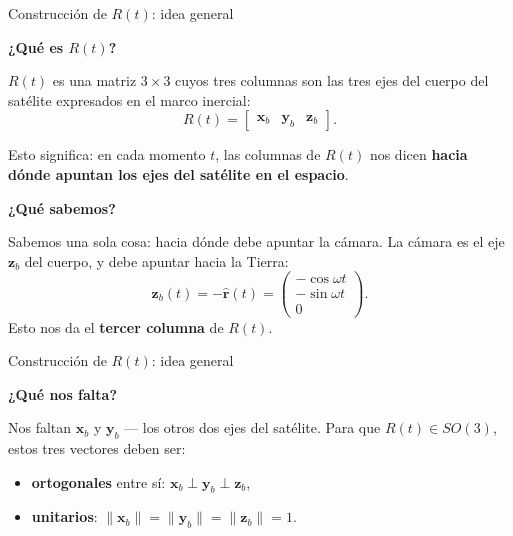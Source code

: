 \documentclass[11pt]{beamer}
\begin{document}
\begin{frame}{Construcción de \(R(t)\): idea general}

\textbf{¿Qué es \(R(t)\)?}

\medskip
\(R(t)\) es una matriz \(3\times 3\) cuyos tres columnas son
las tres ejes del cuerpo del satélite expresados en el marco inercial:
\[
  R(t) = \begin{bmatrix} \bm{x}_b & \bm{y}_b & \bm{z}_b \end{bmatrix}.
\]

Esto significa: en cada momento \(t\), las columnas de \(R(t)\) nos
dicen \textbf{hacia dónde apuntan los ejes del satélite en el espacio}.

\medskip
\textbf{¿Qué sabemos?}

Sabemos una sola cosa: hacia dónde debe apuntar la cámara.
La cámara es el eje \(\bm{z}_b\) del cuerpo, y debe apuntar
hacia la Tierra:
\[
  \bm{z}_b(t) = -\hat{\bm{r}}(t) =
  \begin{pmatrix}-\cos\omega t \\ -\sin\omega t \\ 0\end{pmatrix}.
\]
Esto nos da el \textbf{tercer columna} de \(R(t)\).

\end{frame}


\begin{frame}{Construcción de \(R(t)\): idea general}

\medskip
\textbf{¿Qué nos falta?}

Nos faltan \(\bm{x}_b\) y \(\bm{y}_b\) — los otros dos ejes del
satélite. Para que \(R(t) \in SO(3)\), estos tres vectores deben ser:
\begin{itemize}
  \item \textbf{ortogonales} entre sí: \(\bm{x}_b \perp \bm{y}_b \perp \bm{z}_b\),
  \item \textbf{unitarios}: \(\|\bm{x}_b\| = \|\bm{y}_b\| = \|\bm{z}_b\| = 1\).
\end{itemize}

\end{frame}


\end{document}
